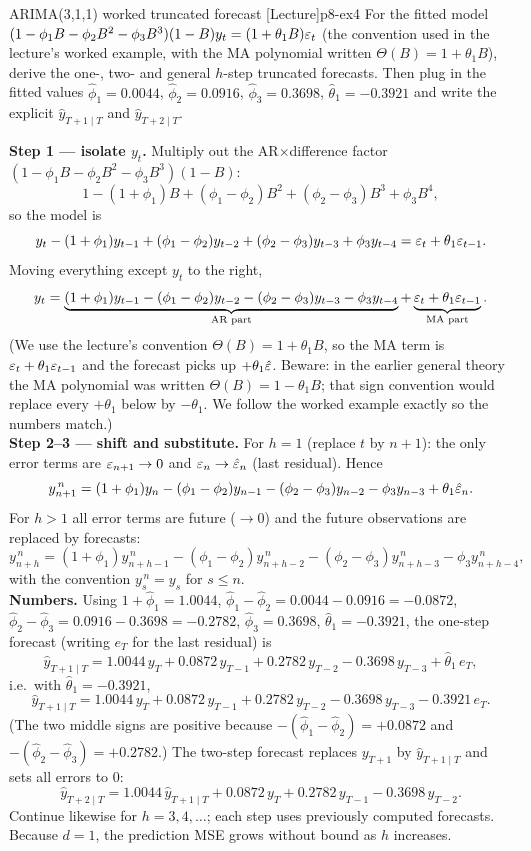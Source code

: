 \begin{exercise}{ARIMA(3,1,1) worked truncated forecast \quad\textnormal{[Lecture]}}{p8-ex4}
For the fitted model $(1-\phi_1B-\phi_2B^2-\phi_3B^3)(1-B)y_t=(1+\theta_1B)\varepsilon_t$
(the convention used in the lecture's worked example, with the MA polynomial
written $\Theta(B)=1+\theta_1B$), derive the one-, two- and general $h$-step
truncated forecasts. Then plug in the fitted values $\hat\phi_1=0.0044$,
$\hat\phi_2=0.0916$, $\hat\phi_3=0.3698$, $\hat\theta_1=-0.3921$ and write the
explicit $\hat y_{T+1\mid T}$ and $\hat y_{T+2\mid T}$.
\end{exercise}
\begin{solution}
\textbf{Step 1 --- isolate $y_t$.} Multiply out the AR$\times$difference factor
$(1-\phi_1B-\phi_2B^2-\phi_3B^3)(1-B)$:
\[
1-(1+\phi_1)B+(\phi_1-\phi_2)B^2+(\phi_2-\phi_3)B^3+\phi_3B^4,
\]
so the model is
\[
y_t-(1+\phi_1)y_{t-1}+(\phi_1-\phi_2)y_{t-2}+(\phi_2-\phi_3)y_{t-3}+\phi_3y_{t-4}
=\varepsilon_t+\theta_1\varepsilon_{t-1}.
\]
Moving everything except $y_t$ to the right,
\[
y_t=\underbrace{(1+\phi_1)y_{t-1}-(\phi_1-\phi_2)y_{t-2}-(\phi_2-\phi_3)y_{t-3}-\phi_3y_{t-4}}_{\text{AR part}}
+\underbrace{\varepsilon_t+\theta_1\varepsilon_{t-1}}_{\text{MA part}} .
\]
(We use the lecture's convention $\Theta(B)=1+\theta_1B$, so the MA term is
$\varepsilon_t+\theta_1\varepsilon_{t-1}$ and the forecast picks up $+\theta_1\hat{\varepsilon}$.
Beware: in the earlier general theory the MA polynomial was written
$\Theta(B)=1-\theta_1B$; that sign convention would replace every $+\theta_1$
below by $-\theta_1$. We follow the worked example exactly so the numbers match.)
\\[3pt]
\textbf{Step 2--3 --- shift and substitute.} For $h=1$ (replace $t$ by $n+1$):
the only error terms are $\varepsilon_{n+1}\to0$ and $\varepsilon_n\to\hat{\varepsilon}_n$ (last
residual). Hence
\[
y^{\,n}_{n+1}=(1+\phi_1)y_n-(\phi_1-\phi_2)y_{n-1}-(\phi_2-\phi_3)y_{n-2}-\phi_3y_{n-3}+\theta_1\hat{\varepsilon}_n .
\]
For $h>1$ all error terms are future ($\to0$) and the future observations are
replaced by forecasts:
\[
y^{\,n}_{n+h}=(1+\phi_1)y^{\,n}_{n+h-1}-(\phi_1-\phi_2)y^{\,n}_{n+h-2}-(\phi_2-\phi_3)y^{\,n}_{n+h-3}-\phi_3y^{\,n}_{n+h-4},
\]
with the convention $y^{\,n}_s=y_s$ for $s\le n$.\\[3pt]
\textbf{Numbers.} Using
$1+\hat\phi_1=1.0044$, $\hat\phi_1-\hat\phi_2=0.0044-0.0916=-0.0872$,
$\hat\phi_2-\hat\phi_3=0.0916-0.3698=-0.2782$, $\hat\phi_3=0.3698$,
$\hat\theta_1=-0.3921$, the one-step forecast (writing $e_T$ for the last
residual) is
\[
\hat y_{T+1\mid T}=1.0044\,y_T+0.0872\,y_{T-1}+0.2782\,y_{T-2}-0.3698\,y_{T-3}+\hat\theta_1\,e_T,
\]
i.e.\ with $\hat\theta_1=-0.3921$,
\[
\hat y_{T+1\mid T}=1.0044\,y_T+0.0872\,y_{T-1}+0.2782\,y_{T-2}-0.3698\,y_{T-3}-0.3921\,e_T .
\]
(The two middle signs are positive because $-(\hat\phi_1-\hat\phi_2)=+0.0872$ and
$-(\hat\phi_2-\hat\phi_3)=+0.2782$.) The two-step forecast replaces $y_{T+1}$ by
$\hat y_{T+1\mid T}$ and sets all errors to $0$:
\[
\hat y_{T+2\mid T}=1.0044\,\hat y_{T+1\mid T}+0.0872\,y_T+0.2782\,y_{T-1}-0.3698\,y_{T-2}.
\]
Continue likewise for $h=3,4,\dots$; each step uses previously computed
forecasts. Because $d=1$, the prediction MSE grows without bound as $h$
increases.
\end{solution}

